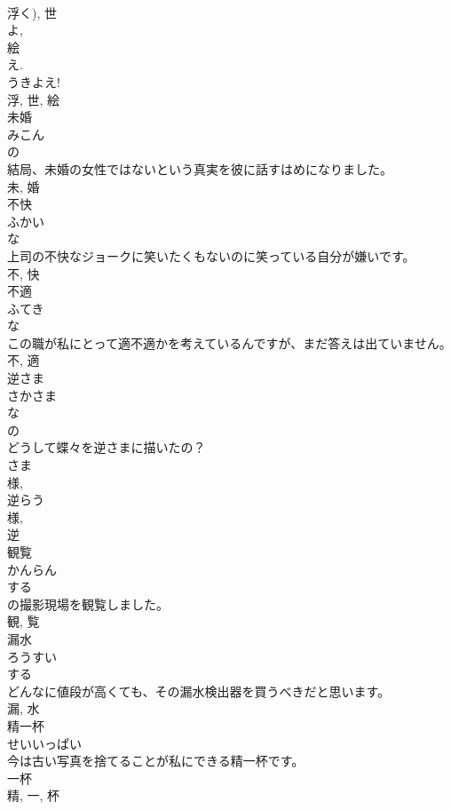 \documentclass[8pt]{extreport}
\begin{document}
\begin{CJK}{UTF8}{min}
\\	浮く), 世 
\\	よ, 
\\	絵 
\\	え. 
\\	うきよえ! 
\\	浮, 世, 絵	
\\	未婚	
\\	みこん	
\\	の 
\\	結局、未婚の女性ではないという真実を彼に話すはめになりました。	
\\	未, 婚	
\\	不快	
\\	ふかい	
\\	な 
\\	上司の不快なジョークに笑いたくもないのに笑っている自分が嫌いです。	
\\	不, 快	
\\	不適	
\\	ふてき	
\\	な 
\\	この職が私にとって適不適かを考えているんですが、まだ答えは出ていません。	
\\	不, 適	
\\	逆さま	
\\	さかさま	
\\	な 
\\	の 
\\	どうして蝶々を逆さまに描いたの？	
\\	さま 
\\	様, 
\\	逆らう 
\\	様, 
\\	逆	
\\	観覧	
\\	かんらん	
\\	する 
\\	の撮影現場を観覧しました。	
\\	観, 覧	
\\	漏水	
\\	ろうすい	
\\	する 
\\	どんなに値段が高くても、その漏水検出器を買うべきだと思います。	
\\	漏, 水	
\\	精一杯	
\\	せいいっぱい	
\\	今は古い写真を捨てることが私にできる精一杯です。	
\\	一杯 
\\	精, 一, 杯	

\end{CJK}
\end{document}
